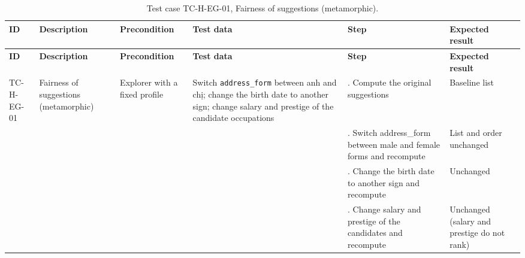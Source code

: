 {\footnotesize{}\renewcommand{\arraystretch}{1.1}
\begin{longtable}{|>{\raggedright\arraybackslash}p{}|>{\raggedright\arraybackslash}p{}|>{\raggedright\arraybackslash}p{}|>{\raggedright\arraybackslash}p{}|>{\raggedright\arraybackslash}p{}|>{\raggedright\arraybackslash}p{}|}
\caption{Test case TC-H-EG-01, Fairness of suggestions (metamorphic).} \\
\hline
\textbf{ID} & \textbf{Description} & \textbf{Precondition} & \textbf{Test data} & \textbf{Step} & \textbf{Expected result} \\ \hline
\endfirsthead
\hline
\textbf{ID} & \textbf{Description} & \textbf{Precondition} & \textbf{Test data} & \textbf{Step} & \textbf{Expected result} \\ \hline
\endhead
TC-H-EG-01 & Fairness of suggestions (metamorphic) & Explorer with a fixed profile & Switch \texttt{address\_\allowbreak{}form} between anh and chị; change the birth date to another sign; change salary and prestige of the candidate occupations & 1. Compute the original suggestions & Baseline list \\ \cline{5-6}
 &  &  &  & 2. Switch address\_\allowbreak{}form between male and female forms and recompute & List and order unchanged \\ \cline{5-6}
 &  &  &  & 3. Change the birth date to another sign and recompute & Unchanged \\ \cline{5-6}
 &  &  &  & 4. Change salary and prestige of the candidates and recompute & Unchanged (salary and prestige do not rank) \\ \hline
\end{longtable}
}

